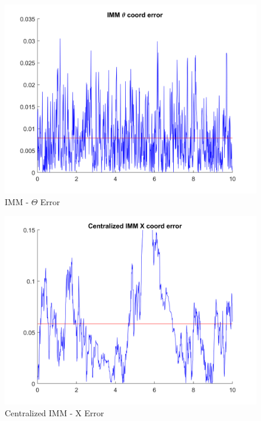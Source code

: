 \documentclass[conference]{IEEEtran}
\begin{document}
\begin{figure}[H]
 \includegraphics[width=\linewidth]{dwg/IMM-theta-error.png}
  \caption{IMM - $\Theta$ Error}
 
\end{figure}

\begin{figure}[H]
 \includegraphics[width=\linewidth]{dwg/CIMM-x-error.png}
  \caption{Centralized IMM - X Error} 
\end{figure}
\end{document}
